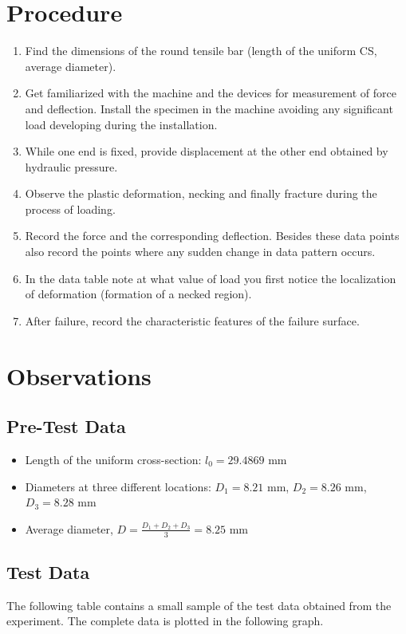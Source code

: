 \documentclass[12pt]{report}
\begin{document}
\section{Procedure}
\begin{enumerate}
    \item Find the dimensions of the round tensile bar (length of the uniform CS, average
          diameter).
    \item Get familiarized with the machine and the devices for measurement of force and
          deflection. Install the specimen in the machine avoiding any significant load
          developing during the installation.
    \item While one end is fixed, provide displacement at the other end obtained by
          hydraulic pressure.
    \item Observe the plastic deformation, necking and finally fracture during the process
          of loading.
    \item Record the force and the corresponding deflection. Besides these data points also
          record the points where any sudden change in data pattern occurs.
    \item In the data table note at what value of load you first notice the localization of
          deformation (formation of a necked region).
    \item After failure, record the characteristic features of the failure surface.
\end{enumerate}

\section{Observations}
\subsection*{Pre-Test Data}
\begin{itemize}
    \item Length of the uniform cross-section: \( l_0 = 29.4869 \) mm
    \item Diameters at three different locations: \( D_1 = 8.21 \) mm, \( D_2 = 8.26 \) mm, \( D_3 = 8.28 \) mm
    \item Average diameter, \( D = \frac{D_1 + D_2 + D_3}{3} = 8.25 \) mm
\end{itemize}

\subsection*{Test Data}
The following table contains a small sample of the test data obtained from
the experiment. The complete data is plotted in the following graph.\\
\end{document}
